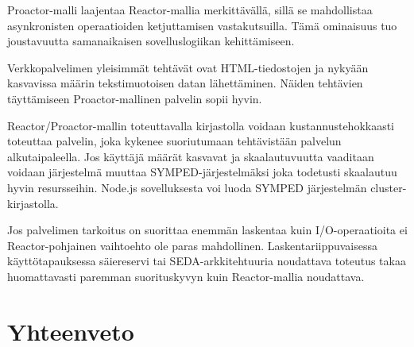 \documentclass[finnish]{tktltiki2}
\theoremstyle{definition}
\theoremstyle{remark}
\begin{document}
Proactor-malli laajentaa Reactor-mallia merkittävällä,
sillä se mahdollistaa asynkronisten operaatioiden
ketjuttamisen vastakutsuilla. Tämä ominaisuus
tuo joustavuutta samanaikaisen sovelluslogiikan kehittämiseen.

Verkkopalvelimen yleisimmät tehtävät ovat 
HTML-tiedostojen ja nykyään kasvavissa määrin
tekstimuotoisen datan lähettäminen. 
Näiden tehtävien täyttämiseen Proactor-mallinen
palvelin sopii hyvin.

Reactor/Proactor-mallin toteuttavalla
kirjastolla voidaan kustannustehokkaasti
toteuttaa palvelin, joka kykenee suoriutumaan
tehtävistään palvelun alkutaipaleella. Jos
käyttäjä määrät kasvavat ja skaalautuvuutta
vaaditaan voidaan järjestelmä muuttaa SYMPED-järjestelmäksi
joka todetusti skaalautuu hyvin resursseihin.
Node.js sovelluksesta voi luoda SYMPED järjestelmän
cluster-kirjastolla.

Jos palvelimen tarkoitus on suorittaa enemmän laskentaa kuin
I/O-operaatioita ei Reactor-pohjainen vaihtoehto ole paras mahdollinen.
Laskentariippuvaisessa käyttötapauksessa säiereservi tai SEDA-arkkitehtuuria
noudattava toteutus takaa huomattavasti paremman suorituskyvyn kuin
Reactor-mallia noudattava.

\section{Yhteenveto}



\end{document}
